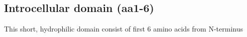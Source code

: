 \subsection{Introcellular domain (aa1-6)}

This short, hydrophilic domain consist of first 6 amino acids from N-terminus